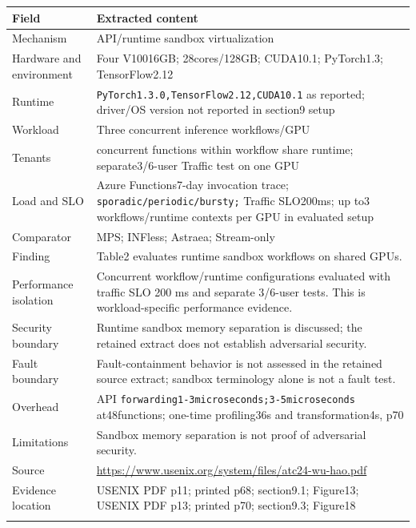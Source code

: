 \cite{P013}

\begin{longtable}{>{\raggedright\arraybackslash}p{}>{\raggedright\arraybackslash}p{}}
\toprule
\textbf{Field} & \textbf{Extracted content}\\\midrule\endhead
Mechanism & API/runtime sandbox virtualization\\\addlinespace
Hardware and environment & Four V10016GB; 28cores/128GB; CUDA10.1; PyTorch1.3; TensorFlow2.12\\\addlinespace
Runtime & \nolinkurl{PyTorch1.3.0,TensorFlow2.12,CUDA10.1} as reported; driver/OS version not reported in section9 setup\\\addlinespace
Workload & Three concurrent inference workflows/GPU\\\addlinespace
Tenants & concurrent functions within workflow share runtime; separate3/6-user Traffic test on one GPU\\\addlinespace
Load and SLO & Azure Functions7-day invocation trace; \nolinkurl{sporadic/periodic/bursty;} Traffic SLO200ms; up to3 workflows/runtime contexts per GPU in evaluated setup\\\addlinespace
Comparator & MPS; INFless; Astraea; Stream-only\\\addlinespace
Finding & Table2 evaluates runtime sandbox workflows on shared GPUs.\\\addlinespace
Performance isolation & Concurrent workflow/runtime configurations evaluated with traffic SLO 200 ms and separate 3/6-user tests. This is workload-specific performance evidence.\\\addlinespace
Security boundary & Runtime sandbox memory separation is discussed; the retained extract does not establish adversarial security.\\\addlinespace
Fault boundary & Fault-containment behavior is not assessed in the retained source extract; sandbox terminology alone is not a fault test.\\\addlinespace
Overhead & API \nolinkurl{forwarding1-3microseconds;3-5microseconds} at48functions; one-time profiling36s and transformation4s, p70\\\addlinespace
Limitations & Sandbox memory separation is not proof of adversarial security.\\\addlinespace
Source & \url{https://www.usenix.org/system/files/atc24-wu-hao.pdf}\\\addlinespace
Evidence location & USENIX PDF p11; printed p68; section9.1; Figure13; USENIX PDF p13; printed p70; section9.3; Figure18\\\addlinespace
\bottomrule\end{longtable}

